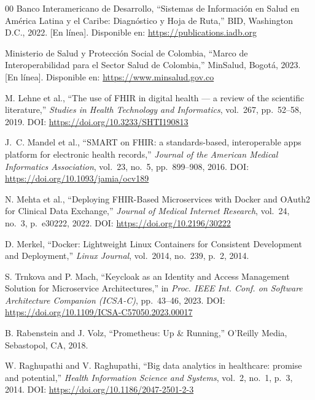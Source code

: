 \documentclass[conference]{IEEEtran}
\begin{document}
\begin{thebibliography}{00}
Banco Interamericano de Desarrollo,
``Sistemas de Informaci\'on en Salud en Am\'erica Latina y el Caribe:
Diagn\'ostico y Hoja de Ruta,''
BID, Washington D.C., 2022.
[En l\'inea]. Disponible en: \url{https://publications.iadb.org}

Ministerio de Salud y Protecci\'on Social de Colombia,
``Marco de Interoperabilidad para el Sector Salud de Colombia,''
MinSalud, Bogot\'a, 2023.
[En l\'inea]. Disponible en: \url{https://www.minsalud.gov.co}

M. Lehne et al.,
``The use of FHIR in digital health --- a review of the scientific
literature,''
\textit{Studies in Health Technology and Informatics}, vol.~267,
pp.~52--58, 2019.
DOI: \url{https://doi.org/10.3233/SHTI190813}

J.~C. Mandel et al.,
``SMART on FHIR: a standards-based, interoperable apps platform for
electronic health records,''
\textit{Journal of the American Medical Informatics Association},
vol.~23, no.~5, pp.~899--908, 2016.
DOI: \url{https://doi.org/10.1093/jamia/ocv189}

N. Mehta et al.,
``Deploying FHIR-Based Microservices with Docker and OAuth2 for Clinical
Data Exchange,''
\textit{Journal of Medical Internet Research}, vol.~24, no.~3,
p.~e30222, 2022.
DOI: \url{https://doi.org/10.2196/30222}

D. Merkel,
``Docker: Lightweight Linux Containers for Consistent Development and
Deployment,''
\textit{Linux Journal}, vol.~2014, no.~239, p.~2, 2014.

S. Trnkova and P. Mach,
``Keycloak as an Identity and Access Management Solution for Microservice
Architectures,''
in \textit{Proc. IEEE Int. Conf. on Software Architecture Companion
(ICSA-C)}, pp.~43--46, 2023.
DOI: \url{https://doi.org/10.1109/ICSA-C57050.2023.00017}

B. Rabenstein and J. Volz,
``Prometheus: Up \& Running,''
O'Reilly Media, Sebastopol, CA, 2018.

W. Raghupathi and V. Raghupathi,
``Big data analytics in healthcare: promise and potential,''
\textit{Health Information Science and Systems}, vol.~2, no.~1, p.~3,
2014.
DOI: \url{https://doi.org/10.1186/2047-2501-2-3}

\end{thebibliography}
\end{document}
